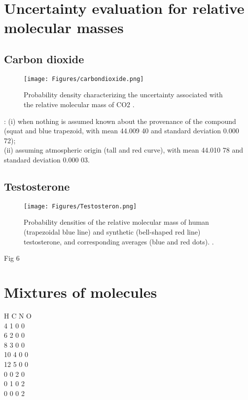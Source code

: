 \documentclass[a5paper,openany]{book}
\begin{document}
\section{Uncertainty evaluation for relative molecular masses}

\subsection{Carbon dioxide}

\begin{figure}[ht] 
\centering\small
\unitlength=1mm
{\texttt{[image: Figures/carbondioxide.png]}} 
\caption {Probability density characterizing the uncertainty associated with the relative molecular mass of CO2 \cite{IUPACUncertainty}.} 
\label{f:carbondioxide}
\end{figure}

: (i) when nothing
is assumed known about the provenance of the compound (squat and blue trapezoid, with mean 44.009 40 and standard deviation
0.000 72); \\
(ii) assuming atmospheric origin (tall and red curve), with mean 44.010 78 and standard deviation 0.000 03.




\subsection{Testosterone}

\begin{figure}[ht] 
	\centering\small
	\unitlength=1mm
	{\texttt{[image: Figures/Testosteron.png]}} 
	\caption { Probability densities of the relative molecular mass of human (trapezoidal blue line) and synthetic (bell-shaped red line) testosterone, and corresponding averages (blue and red dots). \cite{IUPACUncertainty}.} 
	\label{f:Testosteron}
\end{figure}

Fig 6 \\

\section{Mixtures of molecules}


H C N O \\
4 1 0 0 \\
6 2 0 0 \\
8 3 0 0 \\
10 4 0 0 \\
12 5 0 0 \\
0 0 2 0 \\
0 1 0 2 \\
0 0 0 2 \\
\end{document}
